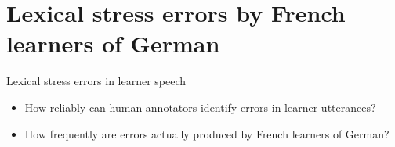 \documentclass[xcolor={dvipsnames}]{beamer}
\begin{document}
%
%
%
%

\section{Lexical stress errors by French learners of German}
		\begin{frame}{Lexical stress errors in learner speech}
		\begin{itemize}
		\item{How reliably can human annotators identify errors in learner utterances?}
		\vspace{1em}
		\item{How frequently are  errors actually produced by French learners of German?}
		\end{itemize}
		

		\end{frame}
		
\end{document}
